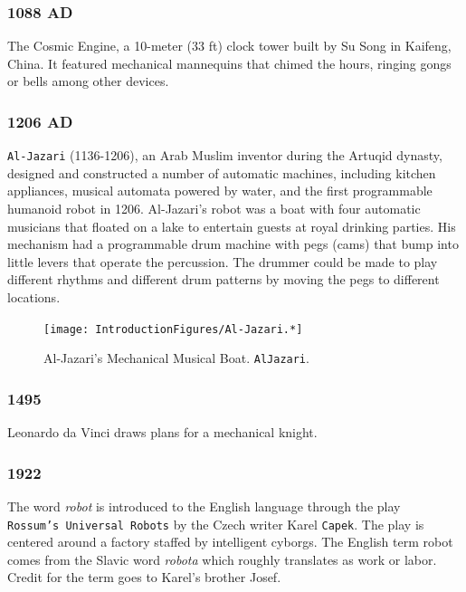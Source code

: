 \hypertarget{ad}{%
\subsubsection{1088 AD}\label{ad}}

The Cosmic Engine, a 10-meter (33 ft) clock tower built by Su Song in
Kaifeng, China. It featured mechanical mannequins that chimed the hours,
ringing gongs or bells among other devices.

\hypertarget{ad-1}{%
\subsubsection{1206 AD}\label{ad-1}}

\texttt{Al-Jazari} (1136-1206), an Arab Muslim inventor during the
Artuqid dynasty, designed and constructed a number of automatic
machines, including kitchen appliances, musical automata powered by
water, and the first programmable humanoid robot in 1206. Al-Jazari's
robot was a boat with four automatic musicians that floated on a lake to
entertain guests at royal drinking parties. His mechanism had a
programmable drum machine with pegs (cams) that bump into little levers
that operate the percussion. The drummer could be made to play different
rhythms and different drum patterns by moving the pegs to different
locations.

\begin{figure}
\centering
\texttt{[image: IntroductionFigures/Al-Jazari.*]}
\caption{Al-Jazari's Mechanical Musical Boat. \texttt{AlJazari}.}
\end{figure}

\hypertarget{section}{%
\subsubsection{1495}\label{section}}

Leonardo da Vinci draws plans for a mechanical knight.

\hypertarget{section-1}{%
\subsubsection{1922}\label{section-1}}

The word \emph{robot} is introduced to the English language through the
play \texttt{Rossum’s\ Universal\ Robots} by the Czech writer Karel
\texttt{Capek}. The play is centered around a factory staffed by
intelligent cyborgs. The English term robot comes from the Slavic word
\emph{robota} which roughly translates as work or labor. Credit for the
term goes to Karel's brother Josef.

